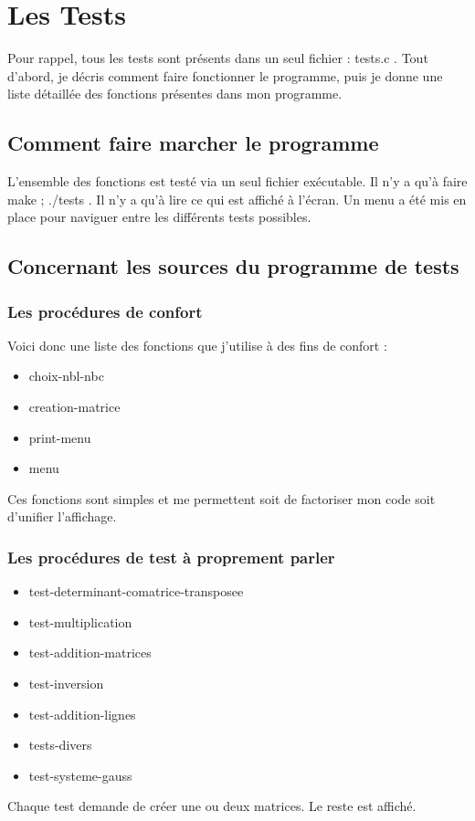 \chapter{Les Tests}

Pour rappel, tous les tests sont présents dans un seul fichier : tests.c .
Tout d'abord, je décris comment faire fonctionner le programme, puis je donne une liste détaillée des fonctions présentes dans mon programme.

\section{Comment faire marcher le programme}

L'ensemble des fonctions est testé via un seul fichier exécutable. Il n'y a qu'à faire make ; ./tests .
Il n'y a qu'à lire ce qui est affiché à l'écran.
Un menu a été mis en place pour naviguer entre les différents tests possibles.

\section{Concernant les sources du programme de tests}
\subsection{Les procédures de confort}

Voici donc une liste des fonctions que j'utilise à des fins de confort : 
\begin{itemize}
	\item choix-nbl-nbc
	\item creation-matrice
	\item print-menu
	\item menu
\end{itemize}

Ces fonctions sont simples et me permettent soit de factoriser mon code soit d'unifier l'affichage.

\subsection{Les procédures de test à proprement parler}

\begin{itemize}
	\item test-determinant-comatrice-transposee
	\item test-multiplication
	\item test-addition-matrices
	\item test-inversion
	\item test-addition-lignes
	\item tests-divers
	\item test-systeme-gauss
\end{itemize}

Chaque test demande de créer une ou deux matrices. Le reste est affiché.

\clearpage
